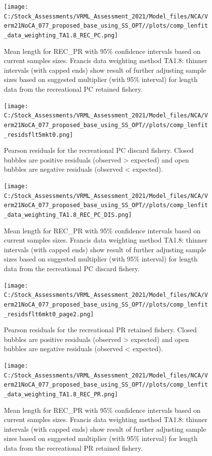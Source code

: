 \documentclass[
  english,
  a4paper,
]{article}
\begin{document}
\begin{figure}
\centering
\texttt{[image: C:/Stock\_Assessments/VRML\_Assessment\_2021/Model\_files/NCA/Verm21NoCA\_077\_proposed\_base\_using\_SS\_OPT//plots/comp\_lenfit\_data\_weighting\_TA1.8\_REC\_PC.png]}
\caption{Mean length for REC\_PR with 95\% confidence intervals based on current samples sizes. Francis data weighting method TA1.8: thinner intervals (with capped ends) show result of further adjusting sample sizes based on suggested multiplier (with 95\% interval) for length data from the recreational PC retained fishery.\label{fig:mean-len-fit-REC-PC}}
\end{figure}

\begin{figure}
\centering
\texttt{[image: C:/Stock\_Assessments/VRML\_Assessment\_2021/Model\_files/NCA/Verm21NoCA\_077\_proposed\_base\_using\_SS\_OPT//plots/comp\_lenfit\_residsflt5mkt0.png]}
\caption{Pearson residuals for the recreational PC discard fishery. Closed bubbles are positive residuals (observed \textgreater{} expected) and open bubbles are negative residuals (observed \textless{} expected).\label{fig:len-pearson-REC-PC-DIS}}
\end{figure}

\begin{figure}
\centering
\texttt{[image: C:/Stock\_Assessments/VRML\_Assessment\_2021/Model\_files/NCA/Verm21NoCA\_077\_proposed\_base\_using\_SS\_OPT//plots/comp\_lenfit\_data\_weighting\_TA1.8\_REC\_PC\_DIS.png]}
\caption{Mean length for REC\_PR with 95\% confidence intervals based on current samples sizes. Francis data weighting method TA1.8: thinner intervals (with capped ends) show result of further adjusting sample sizes based on suggested multiplier (with 95\% interval) for length data from the recreational PC discard fishery.\label{fig:mean-len-fit-REC-PC-DIS}}
\end{figure}

\begin{figure}
\centering
\texttt{[image: C:/Stock\_Assessments/VRML\_Assessment\_2021/Model\_files/NCA/Verm21NoCA\_077\_proposed\_base\_using\_SS\_OPT//plots/comp\_lenfit\_residsflt6mkt0\_page2.png]}
\caption{Pearson residuals for the recreational PR retained fishery. Closed bubbles are positive residuals (observed \textgreater{} expected) and open bubbles are negative residuals (observed \textless{} expected).\label{fig:len-pearson-REC-PR}}
\end{figure}

\begin{figure}
\centering
\texttt{[image: C:/Stock\_Assessments/VRML\_Assessment\_2021/Model\_files/NCA/Verm21NoCA\_077\_proposed\_base\_using\_SS\_OPT//plots/comp\_lenfit\_data\_weighting\_TA1.8\_REC\_PR.png]}
\caption{Mean length for REC\_PR with 95\% confidence intervals based on current samples sizes. Francis data weighting method TA1.8: thinner intervals (with capped ends) show result of further adjusting sample sizes based on suggested multiplier (with 95\% interval) for length data from the recreational PR retained fishery.\label{fig:mean-len-fit-REC-PR}}
\end{figure}
\end{document}
